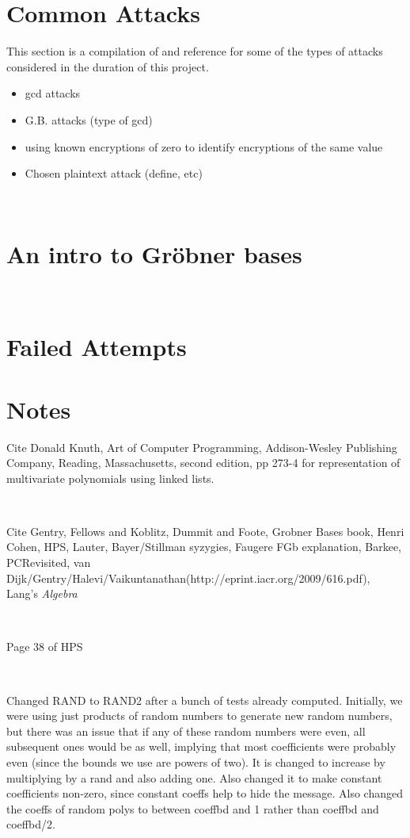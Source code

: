 \documentclass[11pt]{report}
\begin{document}
\section{Common Attacks}

This section is a compilation of and reference for some of the types of attacks considered in the duration of this project.

\begin{itemize}
\item gcd attacks
\item G.B. attacks (type of gcd)
\item using known encryptions of zero to identify encryptions of the same value
\item Chosen plaintext attack (define, etc)
\end{itemize}

\

\section{An intro to Gr\"obner bases}

\

\section{Failed Attempts}

\section{Notes}
Cite Donald Knuth, Art of Computer Programming, Addison-Wesley Publishing Company, Reading, Massachusetts, second edition, pp 273-4 for representation of multivariate polynomials using linked lists.

\

Cite Gentry, Fellows and Koblitz, Dummit and Foote, Grobner Bases book, Henri Cohen, HPS, Lauter, Bayer/Stillman syzygies, Faugere FGb explanation, Barkee, PCRevisited, van Dijk/Gentry/Halevi/Vaikuntanathan(http://eprint.iacr.org/2009/616.pdf), Lang's \emph{Algebra}

\

Page 38 of HPS

\

Changed RAND to RAND2 after a bunch of tests already computed. Initially, we were using just products of random numbers to generate new random numbers, but there was an issue that if any of these random numbers were even, all subsequent ones would be as well, implying that most coefficients were probably even (since the bounds we use are powers of two). It is changed to increase by multiplying by a rand and also adding one. Also changed it to make constant coefficients non-zero, since constant coeffs help to hide the message. Also changed the coeffs of random polys to between coeffbd and 1 rather than coeffbd and coeffbd/2.
\end{document}
